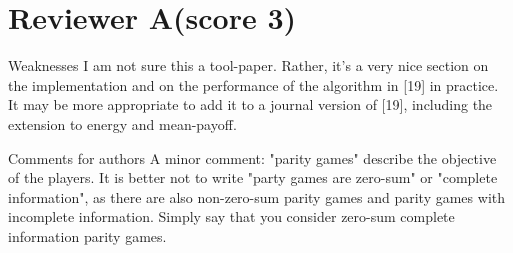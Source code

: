 \documentclass{article}
\begin{document}

\section{Reviewer A(score 3)}\label{rev:A}
\begin{reviewer}
Weaknesses
I am not sure this a tool-paper. Rather, it's a very nice section on the  implementation and on the performance of the algorithm in [19] in practice. It may be more appropriate to add it to a journal version of [19], including the extension to energy and mean-payoff.

Comments for authors
A minor comment: "parity games" describe the objective of the players. It is better not to write "party games are zero-sum" or "complete information", as there are also non-zero-sum parity games and parity games with incomplete information. Simply say that you consider zero-sum complete information parity games.
\end{reviewer}

\end{document}
